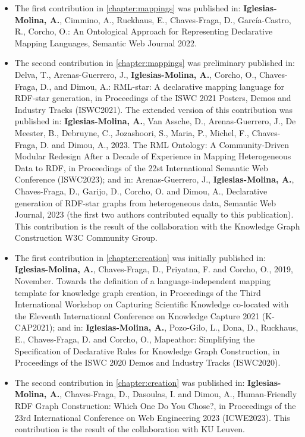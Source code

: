\begin{itemize}
    \item The first contribution in \cref{chapter:mappings} was published in: \textbf{Iglesias-Molina, A.}, Cimmino, A., Ruckhaus, E., Chaves-Fraga, D., García-Castro, R., Corcho, O.: An Ontological Approach for Representing Declarative Mapping Languages, Semantic Web Journal 2022.
    
    \item The second contribution  in \cref{chapter:mappings} was preliminary published in: Delva, T., Arenas-Guerrero, J.,\textbf{ Iglesias-Molina, A.}, Corcho, O., Chaves-Fraga, D., and Dimou, A.: RML-star: A declarative mapping language for RDF-star generation, in Proceedings of the ISWC 2021 Posters, Demos and Industry Tracks (ISWC2021). The extended version of this contribution was published in: \textbf{Iglesias-Molina, A.}, Van Assche, D., Arenas-Guerrero, J., De Meester, B., Debruyne, C., Jozashoori, S., Maria, P., Michel, F., Chaves-Fraga, D. and Dimou, A., 2023. The RML Ontology: A Community-Driven Modular Redesign After a Decade of Experience in Mapping Heterogeneous Data to RDF, in Proceedings of the 22st International Semantic Web Conference (ISWC2023); and in: Arenas-Guerrero, J., \textbf{Iglesias-Molina, A.}, Chaves-Fraga, D., Garijo, D., Corcho, O. and Dimou, A., Declarative generation of RDF-star graphs from heterogeneous data, Semantic Web Journal, 2023 (the first two authors contributed equally to this publication). This contribution is the result of the collaboration with the Knowledge Graph Construction W3C Community Group. 

    \item The first contribution in \cref{chapter:creation} was initially published  in: \textbf{Iglesias-Molina, A.}, Chaves-Fraga, D., Priyatna, F. and Corcho, O., 2019, November. Towards the definition of a language-independent mapping template for knowledge graph creation, in Proceedings of the Third International Workshop on Capturing Scientific Knowledge co-located with the Eleventh International Conference on Knowledge Capture 2021 (K-CAP2021); and in: \textbf{Iglesias-Molina, A.}, Pozo-Gilo, L., Dona, D., Ruckhaus, E., Chaves-Fraga, D. and Corcho, O., Mapeathor: Simplifying the Specification of Declarative Rules for Knowledge Graph Construction, in Proceedings of the ISWC 2020 Demos and Industry Tracks (ISWC2020).

    \item The second contribution in \cref{chapter:creation} was published in: \textbf{Iglesias-Molina, A.}, Chaves-Fraga, D., Dasoulas, I. and Dimou, A., Human-Friendly RDF Graph Construction: Which One Do You Chose?, in Proceedings of the 23rd International Conference on Web Engineering 2023 (ICWE2023). This contribution is the result of the collaboration with KU Leuven.


\end{itemize}
